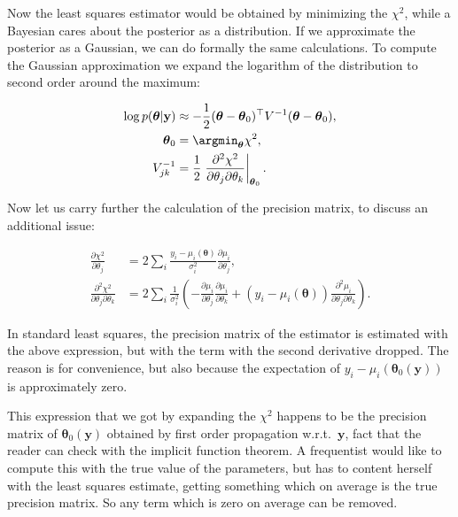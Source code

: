 Now the least squares estimator would be obtained by minimizing the $\chi^2$,
while a Bayesian cares about the posterior as a distribution. If we approximate
the posterior as a Gaussian, we can do formally the same calculations. To
compute the Gaussian approximation we expand the logarithm of the distribution
to second order around the maximum:

\begin{align}
    \log p(\boldsymbol\theta|\mathbf y) &\approx
    -\frac 12 (\boldsymbol\theta-\boldsymbol\theta_0)^\top
    V^{-1} (\boldsymbol\theta-\boldsymbol\theta_0), \\
    \boldsymbol\theta_0 &= \argmin_{\boldsymbol\theta} \chi^2, \\
    V^{-1}_{jk} &= \frac12 \left.
    \frac {\partial^2 \chi^2} {\partial\theta_j \partial\theta_k}
    \right|_{\boldsymbol\theta_0}.
\end{align}

Now let us carry further the calculation of the precision matrix, to discuss
an additional issue:

\begin{align}
    \frac{\partial\chi^2}{\partial\theta_j} &=
    2 \sum_i \frac {y_i - \mu_i(\boldsymbol\theta)} {\sigma_i^2}
    \frac {\partial\mu_i} {\partial\theta_j}, \\
    \frac {\partial^2 \chi^2} {\partial\theta_j \partial\theta_k} &=
    2 \sum_i \frac1{\sigma_i^2} \left(
    -\frac {\partial\mu_i} {\partial\theta_j}
    \frac {\partial\mu_i} {\partial\theta_k}
    + (y_i - \mu_i(\boldsymbol\theta))
    \frac {\partial^2 \mu_i} {\partial\theta_j \partial\theta_k}
    \right). \label{eq:lsqhess}
\end{align}

In standard least squares, the precision matrix of the estimator is estimated
with the above expression, but with the term with the second derivative
dropped. The reason is for convenience, but also because the expectation of
$y_i - \mu_i(\boldsymbol\theta_0(\mathbf y))$ is approximately zero.

This expression that we got by expanding the $\chi^2$ happens to be the
precision matrix of $\boldsymbol\theta_0(\mathbf y)$ obtained by first order
propagation w.r.t.~$\mathbf y$, fact that the reader can check with the
implicit function theorem. A frequentist would like to compute this with the
true value of the parameters, but has to content herself with the least squares
estimate, getting something which on average is the true precision matrix. So
any term which is zero on average can be removed.

